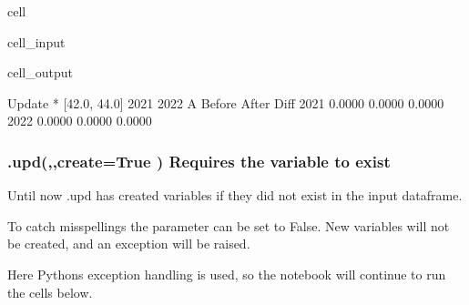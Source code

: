 \documentclass[letterpaper,10pt,english]{jupyterBook}
\begin{document}
\begin{sphinxuseclass}{cell}\begin{sphinxVerbatimInput}

\begin{sphinxuseclass}{cell_input}
\begin{sphinxVerbatim}[commandchars=\\\{\}]
\end{sphinxVerbatim}

\end{sphinxuseclass}\end{sphinxVerbatimInput}
\begin{sphinxVerbatimOutput}

\begin{sphinxuseclass}{cell_output}
\begin{sphinxVerbatim}[commandchars=\\\{\}]
Update * [42.0, 44.0] 2021 2022
A                    Before                After                 Diff
2021                 0.0000               0.0000               0.0000
2022                 0.0000               0.0000               0.0000
\end{sphinxVerbatim}

\end{sphinxuseclass}\end{sphinxVerbatimOutput}

\end{sphinxuseclass}

\subsubsection{.upd(,,create=True ) Requires the variable to exist}
\label{\detokenize{content/04_PythonEssentials/UpdateCommand:upd-create-true-requires-the-variable-to-exist}}
\sphinxAtStartPar
Until now .upd has created variables if they did not exist in the input dataframe.

\sphinxAtStartPar
To catch misspellings the parameter  can be set to False.
New variables will not be created, and an exception will be raised.

\sphinxAtStartPar
Here Pythons exception handling is used, so the notebook will continue to run the cells below.
\end{document}
